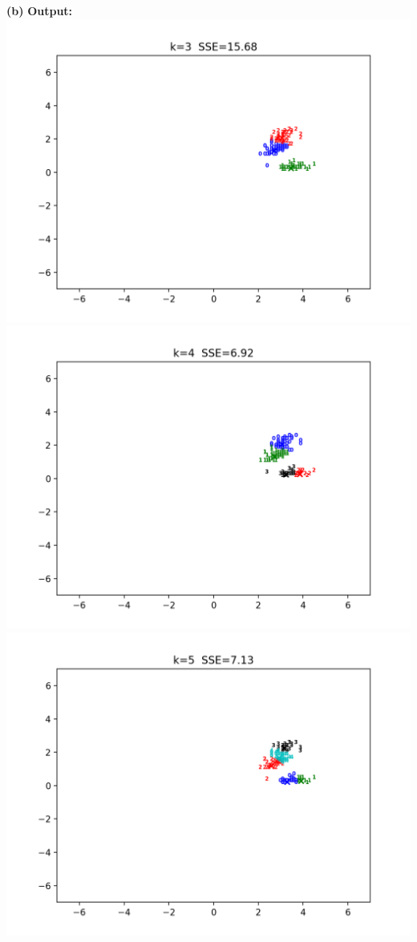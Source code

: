 \documentclass[11pt]{article}
\renewcommand\part[1]{\vspace{.10in}\textbf{(#1)}}
\newcommand\ot{\vspace{.10in}\textbf{Output: }}
\begin{document}
\part{b} \ot
\includegraphics{Figure_1.png}
\includegraphics{Figure_2.png}
\includegraphics{Figure_3.png}
\end{document}

